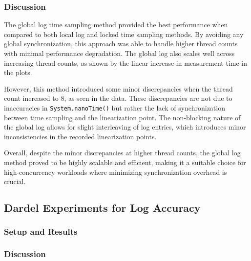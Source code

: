 \documentclass{article}
\begin{document}
\subsubsection{Discussion}
The global log time sampling method provided the best performance when compared to both local log and locked time sampling methods. By avoiding any global synchronization, this approach was able to handle higher thread counts with minimal performance degradation. The global log also scales well across increasing thread counts, as shown by the linear increase in measurement time in the plots.

However, this method introduced some minor discrepancies when the thread count increased to 8, as seen in the data. These discrepancies are not due to inaccuracies in \texttt{System.nanoTime()} but rather the lack of synchronization between time sampling and the linearization point. The non-blocking nature of the global log allows for slight interleaving of log entries, which introduces minor inconsistencies in the recorded linearization points.

Overall, despite the minor discrepancies at higher thread counts, the global log method proved to be highly scalable and efficient, making it a suitable choice for high-concurrency workloads where minimizing synchronization overhead is crucial.



\newpage
\subsection{Dardel Experiments for Log Accuracy}

\subsubsection{Setup and Results}

\subsubsection{Discussion}

\newpage
\printbibliography
\end{document}
